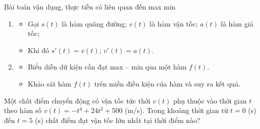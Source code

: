 
\begin{dang}{Bài toán vận dụng, thực tiễn có liên quan đến max min}
	\begin{enumerate}[\iconMT]
		\item {}
		\begin{itemize}
			\item [$\bullet$] Gọi $s(t)$ là hàm quãng đường; $v(t)$ là hàm vận tốc; $a(t)$ là hàm giá tốc;
			\item [$\bullet$] Khi đó $s'(t)=v(t)$; $v'(t)=a(t)$.
		\end{itemize}
		\item {}
		\begin{itemize}
			\item[$\bullet$] Biểu diễn dữ kiện cần đạt max -- min qua một hàm $f(t)$. 
			\item[$\bullet$] Khảo sát hàm $f(t)$ trên miền điều kiện của hàm và suy ra kết quả.
		\end{itemize}
	\end{enumerate}
\end{dang}
\viduminhhoa
\begin{vd}%
	Một chất điểm chuyển động có vận tốc tức thời $v(t)$ phụ thuộc vào thời gian $t$ theo hàm số $v(t)=-t^4+24t^2+500$ (m/s). Trong khoảng thời gian từ $t=0$ (s) đến $t=5$ (s) chất điểm đạt vận tốc lớn nhất tại thời điểm nào?
\end{vd}

